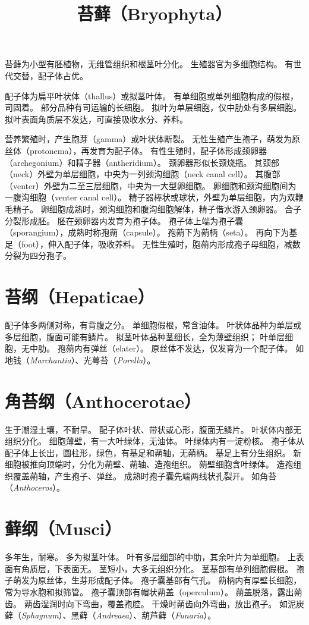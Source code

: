 \documentclass[11pt]{article}
\title{苔藓（Bryophyta）}
\date{}
\begin{document}
  \maketitle

  \linenumbers
苔藓为小型有胚植物，无维管组织和根茎叶分化。
生殖器官为多细胞结构。
有世代交替，配子体占优。

\par

配子体为扁平叶状体（thallus）或拟茎叶体。
有单细胞或单列细胞构成的假根，司固着。
部分品种有司运输的长细胞。
拟叶为单层细胞，仅中肋处有多层细胞。
拟叶表面角质层不发达，可直接吸收水分、养料。

\par

营养繁殖时，产生胞芽（gamma）或叶状体断裂。
无性生殖产生孢子，萌发为原丝体（protonema），再发育为配子体。
有性生殖时，配子体形成颈卵器（archegonium）和精子器（antheridium）。
颈卵器形似长颈烧瓶。
其颈部（neck）外壁为单层细胞，中央为一列颈沟细胞（neck canal cell）。
其腹部（venter）外壁为二至三层细胞，中央为一大型卵细胞。
卵细胞和颈沟细胞间为一腹沟细胞（venter canal cell）。
精子器棒状或球状，外壁为单层细胞，内为双鞭毛精子。
卵细胞成熟时，颈沟细胞和腹沟细胞解体，精子借水游入颈卵器。
合子分裂形成胚。
胚在颈卵器内发育为孢子体。
孢子体上端为孢子囊（sporangium），成熟时称孢蒴（capsule）。
孢蒴下为蒴柄（seta）。
再向下为基足（foot），伸入配子体，吸收养料。
无性生殖时，胞蒴内形成孢子母细胞，减数分裂为四分孢子。

\section{苔纲（Hepaticae）}
配子体多两侧对称，有背腹之分。
单细胞假根，常含油体。
叶状体品种为单层或多层细胞，腹面可能有鳞片。
拟茎叶体品种茎细长，全为薄壁组织；
叶单层细胞，无中肋。
孢蒴内有弹丝（elater）。
原丝体不发达，仅发育为一个配子体。
如地钱（\textit{Marchantia}）、光萼苔（\textit{Porella}）。

\section{角苔纲（Anthocerotae）}
生于潮湿土壤，不耐旱。
配子体叶状、带状或心形，腹面无鳞片。
叶状体内部无组织分化。
细胞薄壁，有一大叶绿体，无油体。
叶绿体内有一淀粉核。
孢子体从配子体上长出，圆柱形，绿色，有基足和蒴轴，无蒴柄。
基足上有分生组织。
新细胞被推向顶端时，分化为蒴壁、蒴轴、造孢组织。
蒴壁细胞含叶绿体。
造孢组织覆盖蒴轴，产生孢子、弹丝。
成熟时孢子囊先端两线状孔裂开。
如角苔（\textit{Anthoceros}）。

\section{藓纲（Musci）}
多年生，耐寒。
多为拟茎叶体。
叶有多层细部的中肋，其余叶片为单细胞。
上表面有角质层，下表面无。
茎短小，大多无组织分化。
茎基部有单列细胞假根。
孢子萌发为原丝体，生芽形成配子体。
孢子囊基部有气孔。
蒴柄内有厚壁长细胞，常为导水胞和拟筛管。
孢子囊顶部有帽状蒴盖（operculum）。
蒴盖脱落，露出蒴齿。
蒴齿湿润时向下弯曲，覆盖孢腔。
干燥时蒴齿向外弯曲，放出孢子。
如泥炭藓（\textit{Sphagnum}）、黑藓（\textit{Andreaea}）、葫芦藓（\textit{Funaria}）。
\end{document}
